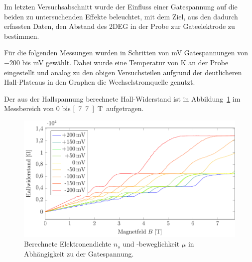 
Im letzten Versuchsabschnitt wurde der Einfluss einer Gatespannung auf die beiden zu untersuchenden Effekte beleuchtet, mit dem Ziel, aus den dadurch erfassten Daten, den Abstand des 2DEG in der Probe zur Gateelektrode zu bestimmen.

Für die folgenden Messungen wurden in Schritten von \unit[50]{mV} Gatespannungen von $-200$ bis \unit[200]{mV} gewählt. Dabei wurde eine Temperatur von \unit[2]{K} an der Probe eingestellt und analog zu den obigen Versuchsteilen aufgrund der deutlicheren Hall-Plateaus in den Graphen die Wechselstromquelle genutzt. 

Der aus der Hallspannung berechnete Hall-Widerstand ist in Abbildung~\ref{fig:gate_mess} im Messbereich von $0$ bis \unit[7.7]{T} aufgetragen.

\begin{figure}[h]
	\centering
	\includegraphics[scale=1]{graphs/gate/full_range.pdf}
	\caption[Auswertung der Gatespannungsvariation]{
		Berechnete Elektronendichte $n_s$ und -beweglichkeit $\mu$ in Abhängigkeit zu der Gatespannung.
	}
	\label{fig:gate_mess}
\end{figure}

